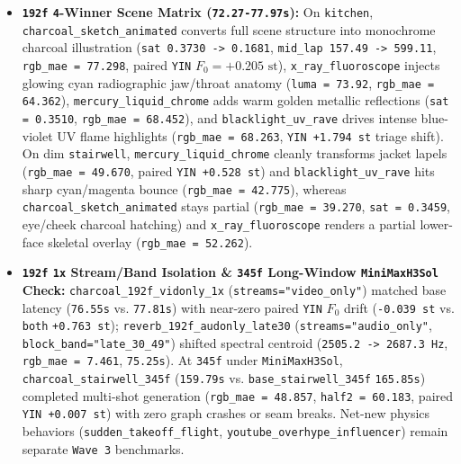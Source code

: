 \documentclass[10pt]{article}
\begin{document}
\begin{itemize}[leftmargin=*]
\item \textbf{\texttt{192f} \texttt{4}-Winner Scene Matrix (\texttt{72.27-77.97s}):} On \texttt{kitchen}, \texttt{charcoal\_sketch\_animated} converts full scene structure into monochrome charcoal illustration (\texttt{sat 0.3730 -> 0.1681}, \texttt{mid\_lap 157.49 -> 599.11}, \texttt{rgb\_mae = 77.298}, paired \texttt{YIN} $F_0 = +0.205\text{ st}$), \texttt{x\_ray\_fluoroscope} injects glowing cyan radiographic jaw/throat anatomy (\texttt{luma = 73.92}, \texttt{rgb\_mae = 64.362}), \texttt{mercury\_liquid\_chrome} adds warm golden metallic reflections (\texttt{sat = 0.3510}, \texttt{rgb\_mae = 68.452}), and \texttt{blacklight\_uv\_rave} drives intense blue-violet UV flame highlights (\texttt{rgb\_mae = 68.263}, \texttt{YIN +1.794 st} triage shift). On dim \texttt{stairwell}, \texttt{mercury\_liquid\_chrome} cleanly transforms jacket lapels (\texttt{rgb\_mae = 49.670}, paired \texttt{YIN +0.528 st}) and \texttt{blacklight\_uv\_rave} hits sharp cyan/magenta bounce (\texttt{rgb\_mae = 42.775}), whereas \texttt{charcoal\_sketch\_animated} stays partial (\texttt{rgb\_mae = 39.270}, \texttt{sat = 0.3459}, eye/cheek charcoal hatching) and \texttt{x\_ray\_fluoroscope} renders a partial lower-face skeletal overlay (\texttt{rgb\_mae = 52.262}).
\item \textbf{\texttt{192f} \texttt{1x} Stream/Band Isolation \& \texttt{345f} Long-Window \texttt{MiniMaxH3Sol} Check:} \texttt{charcoal\_192f\_vidonly\_1x} (\texttt{streams="video\_only"}) matched base latency (\texttt{76.55s} vs. \texttt{77.81s}) with near-zero paired \texttt{YIN} $F_0$ drift (\texttt{-0.039 st} vs. \texttt{both} \texttt{+0.763 st}); \texttt{reverb\_192f\_audonly\_late30} (\texttt{streams="audio\_only"}, \texttt{block\_band="late\_30\_49"}) shifted spectral centroid (\texttt{2505.2 -> 2687.3 Hz}, \texttt{rgb\_mae = 7.461}, \texttt{75.25s}). At \texttt{345f} under \texttt{MiniMaxH3Sol}, \texttt{charcoal\_stairwell\_345f} (\texttt{159.79s} vs. \texttt{base\_stairwell\_345f} \texttt{165.85s}) completed multi-shot generation (\texttt{rgb\_mae = 48.857}, \texttt{half2 = 60.183}, paired \texttt{YIN +0.007 st}) with zero graph crashes or seam breaks. Net-new physics behaviors (\texttt{sudden\_takeoff\_flight}, \texttt{youtube\_overhype\_influencer}) remain separate \texttt{Wave 3} benchmarks.

\end{itemize}
\end{document}
